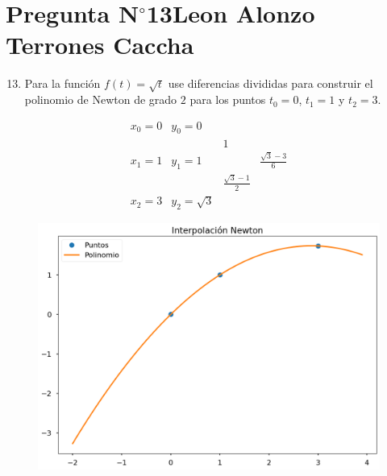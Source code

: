 \section{Pregunta N$^{\circ}$13\qquad Leon Alonzo Terrones Caccha}

\begin{frame}
    \begin{enumerate}\setcounter{enumi}{12}
        \item


              Para la función
              \begin{math}
                  f\left(t\right)=
                  \sqrt{t}
              \end{math}
              use diferencias divididas para construir el polinomio
              de Newton de grado $2$ para los puntos $t_{0}=0$,
              $t_{1}=1$ y $t_{2}=3$.
    \end{enumerate}

    \begin{solution}
    \[
\begin{array}{cccccc}
x_0=0 & y_0=0 \\
    &     & 1 \\
x_1=1 & y_1=1 &             & \frac{\sqrt{3}-3}{6}\\
    &     & \frac{\sqrt{3}-1}{2}\\
x_2=3 & y_2=\sqrt{3}
\end{array}
\]
\end{solution}
\end{frame}
\begin{frame}
        \begin{figure}[ht!]
            \centering
            \includegraphics[width=.6\paperwidth]{P13-2.png}
        \end{figure}
\end{frame}